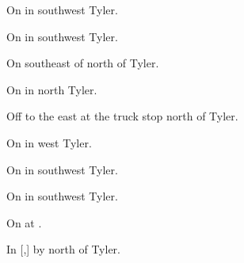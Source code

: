
\begin{LocationList}

On  in southwest Tyler.

On  in southwest Tyler.

On  southeast of  north of Tyler.

On  in north Tyler.

Off  to the east at the  truck stop north of Tyler.

On  in west Tyler.

On  in southwest Tyler.

On  in southwest Tyler.

\Location{\TruckService \Service}
On  at .

\Location{\TruckStop \Gas \Rest \Weigh}
In [,] by   north of Tyler.

\end{LocationList}
